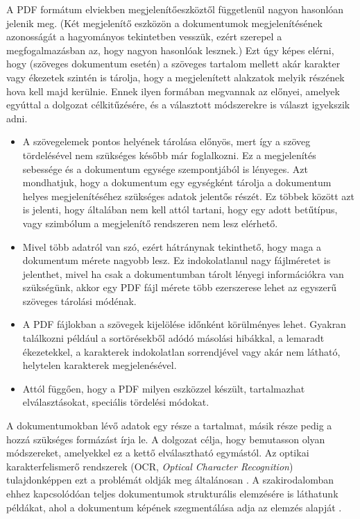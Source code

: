 A PDF formátum elviekben megjelenítőeszköztől függetlenül nagyon hasonlóan jelenik meg. (Két megjelenítő eszközön a dokumentumok megjelenítésének azonosságát a hagyományos tekintetben vesszük, ezért szerepel a megfogalmazásban az, hogy nagyon hasonlóak lesznek.)
Ezt úgy képes elérni, hogy (szöveges dokumentum esetén) a szöveges tartalom mellett akár karakter vagy ékezetek szintén is tárolja, hogy a megjelenített alakzatok melyik részének hova kell majd kerülnie.
Ennek ilyen formában megvannak az előnyei, amelyek egyúttal a dolgozat célkitűzésére, és a választott módszerekre is választ igyekszik adni.
\begin{itemize}
\item A szövegelemek pontos helyének tárolása előnyös, mert így a szöveg tördelésével nem szükséges később már foglalkozni. Ez a megjelenítés sebessége és a dokumentum egysége szempontjából is lényeges. Azt mondhatjuk, hogy a dokumentum egy egységként tárolja a dokumentum helyes megjelenítéséhez szükséges adatok jelentős részét. Ez többek között azt is jelenti, hogy általában nem kell attól tartani, hogy egy adott betűtípus, vagy szimbólum a megjelenítő rendszeren nem lesz elérhető.
\item Mivel több adatról van szó, ezért hátránynak tekinthető, hogy maga a dokumentum mérete nagyobb lesz. Ez indokolatlanul nagy fájlméretet is jelenthet, mivel ha csak a dokumentumban tárolt lényegi információkra van szükségünk, akkor egy PDF fájl mérete több ezerszerese lehet az egyszerű szöveges tárolási módénak.
\item A PDF fájlokban a szövegek kijelölése időnként körülményes lehet. Gyakran találkozni például a sortörésekből adódó másolási hibákkal, a lemaradt ékezetekkel, a karakterek indokolatlan sorrendjével vagy akár nem látható, helytelen karakterek megjelenésével.
\item Attól függően, hogy a PDF milyen eszközzel készült, tartalmazhat elválasztásokat, speciális tördelési módokat.
\end{itemize}


A dokumentumokban lévő adatok egy része a tartalmat, másik része pedig a hozzá szükséges formázást írja le.
A dolgozat célja, hogy bemutasson olyan módszereket, amelyekkel ez a kettő elválasztható egymástól.
Az optikai karakterfelismerő rendszerek (OCR, \textit{Optical Character Recognition}) tulajdonképpen ezt a problémát oldják meg általánosan \cite{mori1999optical}.
A szakirodalomban ehhez kapcsolódóan teljes dokumentumok strukturális elemzésére is láthatunk példákat, ahol a dokumentum képének szegmentálása adja az elemzés alapját \cite{fujisawa1992segmentation}.

